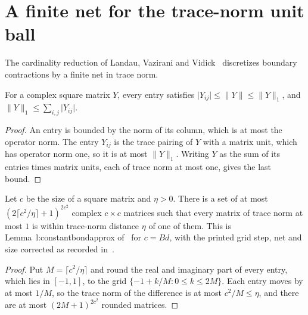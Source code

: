 \section{A finite net for the trace-norm unit ball}

The cardinality reduction of Landau, Vazirani and
Vidick~\cite[lines 451--460]{Landau2013PolynomialTime} discretizes boundary
contractions by a finite net in trace norm.

\begin{theorem}
    \label{thm:trace_norm_entries}
    \leanok
    For a complex square matrix $Y$, every entry satisfies
    $\lvert Y_{ij}\rvert\le\lVert Y\rVert\le\lVert Y\rVert_1$, and
    $\lVert Y\rVert_1\le\sum_{i,j}\lvert Y_{ij}\rvert$.
\end{theorem}

\begin{proof}
    \leanok
    An entry is bounded by the norm of its column, which is at most the
    operator norm. The entry $Y_{ij}$ is the trace pairing of $Y$ with a
    matrix unit, which has operator norm one, so it is at most
    $\lVert Y\rVert_1$. Writing $Y$ as the sum of its entries times matrix
    units, each of trace norm at most one, gives the last bound.
\end{proof}

\begin{theorem}
    \label{thm:trace_norm_net}
    \leanok
    Let $c$ be the size of a square matrix and $\eta>0$. There is a set of at
    most $(2\lceil c^2/\eta\rceil+1)^{2c^2}$ complex $c\times c$ matrices such
    that every matrix of trace norm at most $1$ is within trace-norm distance
    $\eta$ of one of them. This is Lemma~l:constantbondapprox
    of~\cite[lines 451--460]{Landau2013PolynomialTime} for $c=Bd$, with the
    printed grid step, net and size corrected as recorded
    in~\cite{gap:lvv13_trace_norm_net}.
\end{theorem}

\begin{proof}
    \leanok
    Put $M=\lceil c^2/\eta\rceil$ and round the real and imaginary part of
    every entry, which lies in $[-1,1]$, to the grid
    $\{-1+k/M:0\le k\le2M\}$. Each entry moves by at most $1/M$, so the trace
    norm of the difference is at most $c^2/M\le\eta$, and there are at most
    $(2M+1)^{2c^2}$ rounded matrices.
\end{proof}
